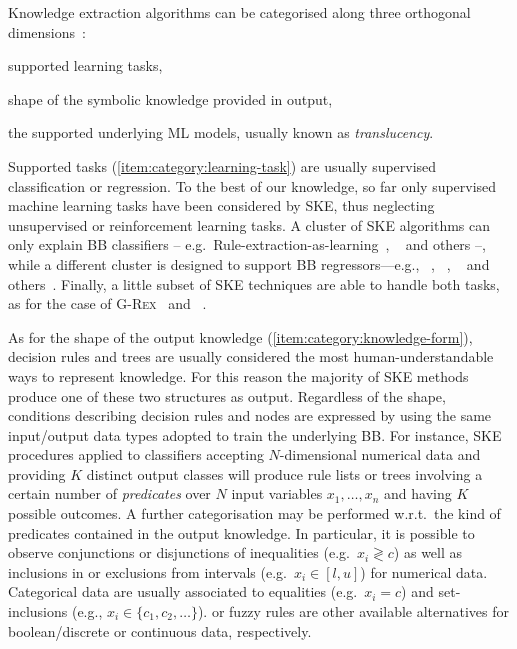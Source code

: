 \documentclass[
]{ceurart}
\begin{document}
Knowledge extraction algorithms can be categorised along three orthogonal dimensions~\cite{xaisurvey-ia14}:
%
\begin{inlinelist}
    \item\label{item:category:learning-task} supported learning tasks,
    \item\label{item:category:knowledge-form} shape of the symbolic knowledge provided in output,
    \item\label{item:category:translucency} the supported underlying ML models, usually known as \emph{translucency}.
\end{inlinelist}

Supported tasks (\cref{item:category:learning-task}) are usually supervised classification or regression.
%
To the best of our knowledge, so far only supervised machine learning tasks have been considered by SKE, thus neglecting unsupervised or reinforcement learning tasks.
%
A cluster of SKE algorithms can only explain BB classifiers -- e.g.\ Rule-extraction-as-learning~\cite{craven1994using}, \trepan~\cite{craven1996extracting} and others \cite{barakat2005eclectic,martens2007comprehensible} --, while a different cluster is designed to support BB regressors---e.g., \iter~\cite{huysmans2006iter}, \gridex~\cite{gridex-extraamas2021}, \gridrex{}~\cite{gridrex-kr2022} and others~\cite{setiono2002extraction,schmitz1999ann,saito2002extracting}.
%
Finally, a little subset of SKE techniques are able to handle both tasks, as for the case of \textsc{G-Rex}~\cite{grex-icdm2008} and \cart~\cite{breiman1984classification}.

As for the shape of the output knowledge (\cref{item:category:knowledge-form}), decision rules \cite{freitas2014comprehensible,huysmans2011empirical,murphy1991id2} and trees \cite{quinlan1993c4,simplifyingdt-ijmms27} are usually considered the most human-understandable ways to represent knowledge.
%
For this reason the majority of SKE methods produce one of these two structures as output.
%
Regardless of the shape, conditions describing decision rules and nodes are expressed by using the same input/output data types adopted to train the underlying BB.
%
For instance, SKE procedures applied to classifiers accepting $N$-dimensional numerical data and providing $K$ distinct output classes will produce rule lists or trees involving a certain number of \emph{predicates} over $N$ input variables $x_1, \ldots, x_n$ and having $K$ possible outcomes.
%
A further categorisation may be performed w.r.t.\ the kind of predicates contained in the output knowledge.
%
In particular, it is possible to observe conjunctions or disjunctions of inequalities (e.g.\ $x_i \gtrless c$) as well as inclusions in or exclusions from intervals (e.g.\ $x_i \in [l, u]$) for numerical data.
%
Categorical data are usually associated to equalities (e.g.\ $x_i = c$) and set-inclusions (e.g., $x_i \in \{c_1, c_2, \ldots \}$).
%
\mofn{} or fuzzy rules are other available alternatives for boolean/discrete or continuous data, respectively.
\end{document}
